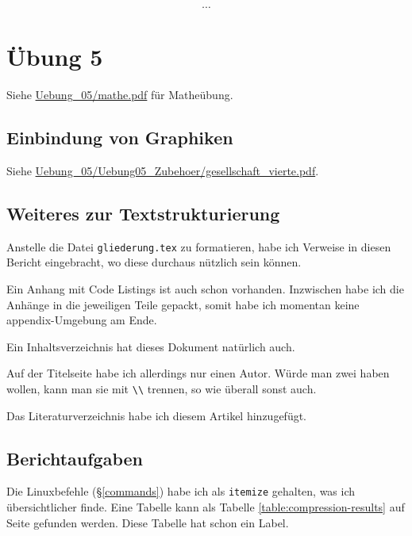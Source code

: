 \[ \cdots \]


\chapter{Übung 5}

Siehe \url{Uebung_05/mathe.pdf} für Matheübung.

\section{Einbindung von Graphiken}
Siehe \url{Uebung_05/Uebung05_Zubehoer/gesellschaft_vierte.pdf}.

\section{Weiteres zur Textstrukturierung}
Anstelle die Datei \texttt{gliederung.tex} zu formatieren, habe ich Verweise in diesen Bericht eingebracht, wo diese durchaus nützlich sein können.

Ein Anhang mit Code Listings ist auch schon vorhanden. Inzwischen habe ich die Anhänge in die jeweiligen Teile gepackt, somit habe ich momentan keine appendix-Umgebung am Ende.

Ein Inhaltsverzeichnis hat dieses Dokument natürlich auch.

Auf der Titelseite habe ich allerdings nur einen Autor. Würde man zwei haben wollen, kann man sie mit \verb#\\# trennen, so wie überall sonst auch.

Das Literaturverzeichnis habe ich diesem Artikel hinzugefügt.

\section{Berichtaufgaben}

Die Linuxbefehle (§\ref{commands}) habe ich als \texttt{itemize} gehalten, was ich übersichtlicher finde. Eine Tabelle kann als Tabelle \ref{table:compression-results} auf Seite \pageref{table:compression-results} gefunden werden. Diese Tabelle hat schon ein Label.
